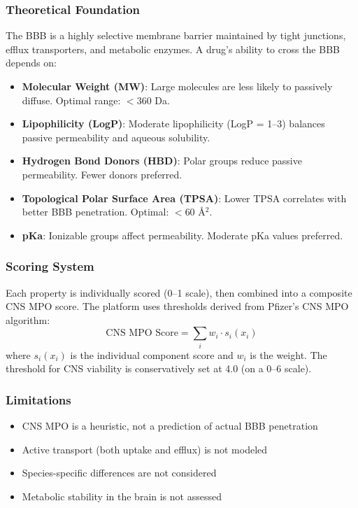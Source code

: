 \documentclass[12pt,a4paper]{article}
\begin{document}
\subsubsection{Theoretical Foundation}
The BBB is a highly selective membrane barrier maintained by tight junctions, efflux transporters, and metabolic enzymes. A drug's ability to cross the BBB depends on:
\begin{itemize}
  \item \textbf{Molecular Weight (MW)}: Large molecules are less likely to passively diffuse. Optimal range: $< 360$ Da.
  \item \textbf{Lipophilicity (LogP)}: Moderate lipophilicity (LogP = 1--3) balances passive permeability and aqueous solubility.
  \item \textbf{Hydrogen Bond Donors (HBD)}: Polar groups reduce passive permeability. Fewer donors preferred.
  \item \textbf{Topological Polar Surface Area (TPSA)}: Lower TPSA correlates with better BBB penetration. Optimal: $< 60$ \AA$^2$.
  \item \textbf{pKa}: Ionizable groups affect permeability. Moderate pKa values preferred.
\end{itemize}

\subsubsection{Scoring System}
Each property is individually scored (0--1 scale), then combined into a composite CNS MPO score. The platform uses thresholds derived from Pfizer's CNS MPO algorithm:
\[
\text{CNS MPO Score} = \sum_{i} w_i \cdot s_i(x_i)
\]
where $s_i(x_i)$ is the individual component score and $w_i$ is the weight. The threshold for CNS viability is conservatively set at 4.0 (on a 0--6 scale).

\subsubsection{Limitations}
\begin{itemize}
  \item CNS MPO is a heuristic, not a prediction of actual BBB penetration
  \item Active transport (both uptake and efflux) is not modeled
  \item Species-specific differences are not considered
  \item Metabolic stability in the brain is not assessed
\end{itemize}
\end{document}
